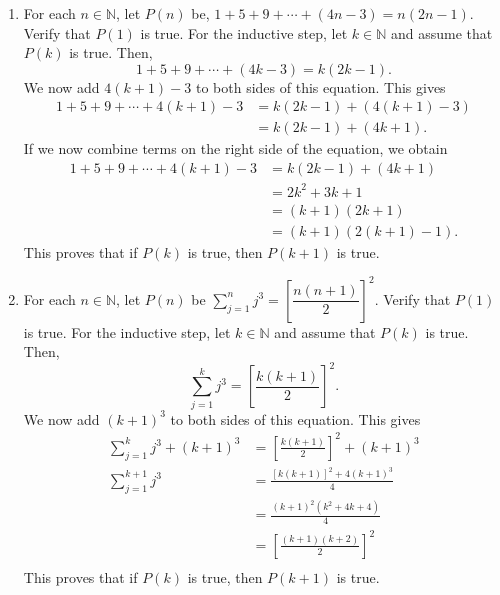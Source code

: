 \begin{enumerate}
\begin{enumerate}
\item For each  $n \in \mathbb{N}$, let  $P\left( n \right)$ be, 
$1 + 5 + 9 +  \cdots  + \left( {4n - 3} \right) = n(2n - 1)$.  Verify that  
$P\left( 1 \right)$  is true.   For the inductive step, let $k \in \mathbb{N}$ and assume that 
$P \left( k \right)$ is true.  Then,
\[
  1 + 5 + 9 + \cdots  + \left( {4k - 3} \right) = k(2k - 1). 
\]
We now add $4 \left( k + 1 \right) - 3$ to both sides of this equation.  This gives
\begin{align*}
  1 + 5 + 9 + \cdots  + 4 \left( {k + 1} \right)-3 &= 
           k(2k - 1) +( 4 \left( k + 1 \right) - 3) \\   
   &= k(2k - 1) +( 4k + 1).
\end{align*}
If we now combine  terms on the right side of the equation, we obtain
\begin{align*}
  1 + 5 + 9 + \cdots  + 4 \left( {k + 1} \right)-3 &= k(2k - 1) +( 4k + 1) \\
                                                   &= 2k^2 + 3k + 1\\
                                                   &= (k + 1)(2k + 1) \\
                                                   &= (k + 1)(2(k + 1) - 1).
\end{align*}
This proves that if  $P\left( k \right)$ is true, then $P\left( {k + 1} \right)$ is true.

\item For each $n \in \mathbb{N}$, let  $P\left( n \right)$ be 
$\sum\limits_{j = 1}^n {j^3 }  = \left[ {\dfrac{{n\left( {n + 1} \right)}}{2}} \right]^2$.  Verify that  $P\left( 1 \right)$  is true.   For the inductive step, let $k \in \mathbb{N}$ and assume that $P \left( k \right)$ is true.  Then,
\[
\sum\limits_{j = 1}^k {j^3 }  = \left[ {\frac{{k\left( {k + 1} \right)}}{2}} \right]^2.
\]
We now add $\left( k + 1 \right)^3$ to both sides of this equation.  This gives
\[
\begin{aligned}
\sum\limits_{j = 1}^k {j^3 } + \left( k + 1 \right)^3 &= 
\left[ {\frac{{k\left( {k + 1} \right)}}{2}} \right]^2 + \left( k + 1 \right)^3 \\
\sum\limits_{j = 1}^{k+1} {j^3} &= 
\frac{{\left[ {k\left( {k + 1} \right)} \right]^2  + 4\left( {k + 1} \right)^3 }}{4} \\
  &= \frac{\left( k + 1 \right)^2 \left( k^2 + 4k + 4 \right) }{4} \\
  &= \left[ \frac{\left( k + 1 \right) \left( k + 2 \right)}{2} \right]^2 \\
\end{aligned}
\]
This proves that if  $P\left( k \right)$ is true, then $P\left( {k + 1} \right)$ is true.
\end{enumerate}



\end{enumerate}
